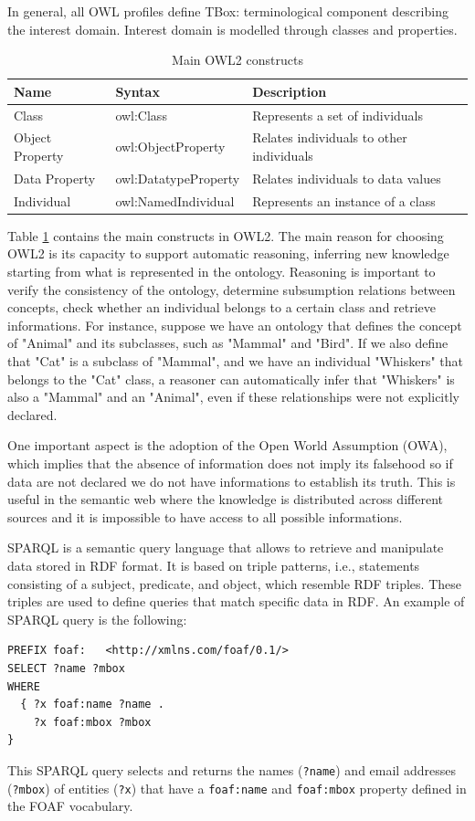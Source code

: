 In general, all OWL profiles define TBox: terminological component describing the interest domain. Interest domain is modelled through classes and properties.
\begin{table}[H]
    \centering
    \begin{tabular}{|>{\raggedright\arraybackslash}p{4cm}|>{\raggedright\arraybackslash}p{4cm}|>{\raggedright\arraybackslash}p{4cm}|}
        \hline
        Name & Syntax & Description \\ \hline
        Class & owl:Class & Represents a set of individuals \\ \hline
        Object Property & owl:ObjectProperty & Relates individuals to other individuals \\ \hline
        Data Property & owl:DatatypeProperty & Relates individuals to data values \\ \hline
        Individual & owl:NamedIndividual & Represents an instance of a class \\ \hline
    \end{tabular}
    \caption{Main OWL2 constructs}
    \label{table:t_2_1}
\end{table}
Table \ref{table:t_2_1} contains the main constructs in OWL2.
The main reason for choosing OWL2 is its capacity to support automatic reasoning, inferring new knowledge starting from what is represented in the ontology.
Reasoning is important to verify the consistency of the ontology, determine subsumption relations between concepts, check whether an individual belongs to a certain class and retrieve informations.
For instance, suppose we have an ontology that defines the concept of "Animal" and its subclasses, such as "Mammal" and "Bird". If we also define that "Cat" is a subclass of "Mammal", and we have an individual "Whiskers" that belongs to the "Cat" class, a reasoner can automatically infer that "Whiskers" is also a "Mammal" and an "Animal", even if these relationships were not explicitly declared.

One important aspect is the adoption of the Open World Assumption (OWA), which implies that the absence of information does not imply its falsehood so if data are not declared we do not have informations to establish its truth.
This is useful in the semantic web where the knowledge is distributed across different sources and it is impossible to have access to all possible informations.

SPARQL is a semantic query language that allows to retrieve and manipulate data stored in RDF format.
It is based on triple patterns, i.e., statements consisting of a subject, predicate, and object, which resemble RDF triples. These triples are used to define queries that match specific data in RDF.
An example of SPARQL query is the following:
\begin{lstlisting}
PREFIX foaf:   <http://xmlns.com/foaf/0.1/>
SELECT ?name ?mbox
WHERE
  { ?x foaf:name ?name .
    ?x foaf:mbox ?mbox 
}    
\end{lstlisting}
This SPARQL query selects and returns the names (\texttt{?name}) and email addresses (\texttt{?mbox}) of entities (\texttt{?x}) that have a \texttt{foaf:name} and \texttt{foaf:mbox} property defined in the FOAF vocabulary. 

